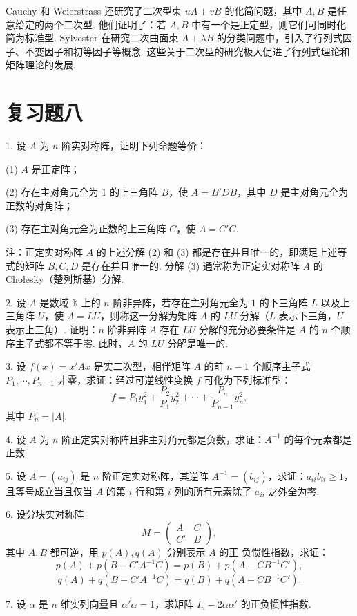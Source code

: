 \documentclass[UTF8, 12pt, fontset=fandol, oneside]{ctexart}
\begin{document}
Cauchy 和 Weierstrass 还研究了二次型束 $uA+vB$ 的化简问题，其中 $A,B$ 是任意给定的两个二次型. 他们证明了：若 $A,B$ 中有一个是正定型，则它们可同时化简为标准型. Sylvester 在研究二次曲面束 $A+\lambda B$ 的分类问题中，引入了行列式因子、不变因子和初等因子等概念. 这些关于二次型的研究极大促进了行列式理论和矩阵理论的发展.

\section*{复习题八}

1. 设 $A$ 为 $n$ 阶实对称阵，证明下列命题等价：

(1) $A$ 是正定阵；

(2) 存在主对角元全为 $1$ 的上三角阵 $B$，使 $A=B'DB$，其中 $D$ 是主对角元全为正数的对角阵；

(3) 存在主对角元全为正数的上三角阵 $C$，使 $A=C'C$.

注：正定实对称阵 $A$ 的上述分解 (2) 和 (3) 都是存在并且唯一的，即满足上述等式的矩阵 $B,C,D$ 是存在并且唯一的. 分解 (3) 通常称为正定实对称阵 $A$ 的 Cholesky（楚列斯基）分解.

2. 设 $A$ 是数域 $\mathbb K$ 上的 $n$ 阶非异阵，若存在主对角元全为 $1$ 的下三角阵 $L$ 以及上三角阵 $U$，使 $A=LU$，则称这一分解为矩阵 $A$ 的 $LU$ 分解（$L$ 表示下三角，$U$ 表示上三角）. 证明：$n$ 阶非异阵 $A$ 存在 $LU$ 分解的充分必要条件是 $A$ 的 $n$ 个顺序主子式都不等于零. 此时，$A$ 的 $LU$ 分解是唯一的.

3. 设 $f(x)=x'Ax$ 是实二次型，相伴矩阵 $A$ 的前 $n-1$ 个顺序主子式 $P_1,\cdots,P_{n-1}$ 非零，求证：经过可逆线性变换 $f$ 可化为下列标准型：
\[
f=P_1y_1^2+\frac{P_2}{P_1}y_2^2+\cdots+\frac{P_n}{P_{n-1}}y_n^2,
\]
其中 $P_n=|A|$.

4. 设 $A$ 为 $n$ 阶正定实对称阵且非主对角元都是负数，求证：$A^{-1}$ 的每个元素都是正数.

5. 设 $A=(a_{ij})$ 是 $n$ 阶正定实对称阵，其逆阵 $A^{-1}=(b_{ij})$，求证：$a_{ii}b_{ii}\geq 1$，且等号成立当且仅当 $A$ 的第 $i$ 行和第 $i$ 列的所有元素除了 $a_{ii}$ 之外全为零.

6. 设分块实对称阵
\[
M=\left(\begin{array}{cc}A&C\\ C'&B\end{array}\right),
\]
其中 $A,B$ 都可逆，用 $p(A),q(A)$ 分别表示 $A$ 的正
负惯性指数，求证：
\[
p(A)+p(B-C'A^{-1}C)=p(B)+p(A-CB^{-1}C'),
\]
\[
q(A)+q(B-C'A^{-1}C)=q(B)+q(A-CB^{-1}C').
\]

7. 设 $\alpha$ 是 $n$ 维实列向量且 $\alpha'\alpha=1$，求矩阵 $I_n-2\alpha\alpha'$ 的正负惯性指数.
\end{document}
